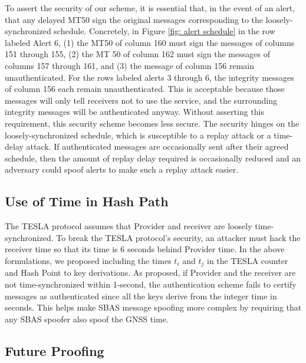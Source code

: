 \documentclass[letterpaper,times]{IONconf/IONconf}
\begin{document}
To assert the security of our scheme, it is essential that, in the event of an alert, that any delayed MT50 sign the original messages corresponding to the loosely-synchronized schedule.
Concretely, in Figure \ref{fig: alert schedule} in the row labeled Alert 6, (1) the MT50 of column 160 must sign the messages of columns 151 through 155, (2) the MT 50 of column 162 must sign the messages of columns 157 through 161, and (3) the message of column 156 remain unauthenticated.
For the rows labeled alerts 3 through 6, the integrity messages of column 156 each remain unauthenticated.
This is acceptable because those messages will only tell receivers not to use the service, and the surrounding integrity messages will be authenticated anyway.
Without asserting this requirement, this security scheme becomes less secure.
The security hinges on the loosely-synchronized schedule, which is susceptible to a replay attack or a time-delay attack.
If authenticated messages are occasionally sent after their agreed schedule, then the amount of replay delay required is occasionally reduced and an adversary could spoof alerts to make such a replay attack easier.

\subsection{Use of Time in Hash Path} \label{sec: time and keys}

The TESLA protocol assumes that Provider and receiver are loosely time-synchronized.
To break the TESLA protocol's security, an attacker must hack the receiver time so that its time is 6 seconds behind Provider time.
In the above formulations, we proposed including the times $t_i$ and $t_j$ in the TESLA counter and Hash Point to key derivations.
As proposed, if Provider and the receiver are not time-synchronized within 1-second, the authentication scheme fails to certify messages as authenticated since all the keys derive from the integer time in seconds.
This helps make SBAS message spoofing more complex by requiring that any SBAS spoofer also spoof the GNSS time.

\subsection{Future Proofing}
\end{document}
